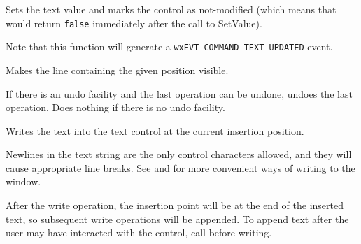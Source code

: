 
Sets the text value and marks the control as not-modified (which means that 
 would return {\tt false} immediately
after the call to SetValue).

Note that this function will generate a {\tt wxEVT\_COMMAND\_TEXT\_UPDATED}
event.




\label{wxtextctrlshowposition}


Makes the line containing the given position visible.




\label{wxtextctrlundo}


If there is an undo facility and the last operation can be undone, undoes the last operation. Does nothing
if there is no undo facility.


\label{wxtextctrlwritetext}


Writes the text into the text control at the current insertion position.




Newlines in the text string
are the only control characters allowed, and they will cause appropriate
line breaks.  See  and  for more convenient ways of writing to the window.

After the write operation, the insertion point will be at the end of the inserted text, so subsequent write operations will be appended. To append text after the user may have interacted with the control, call  before writing.



